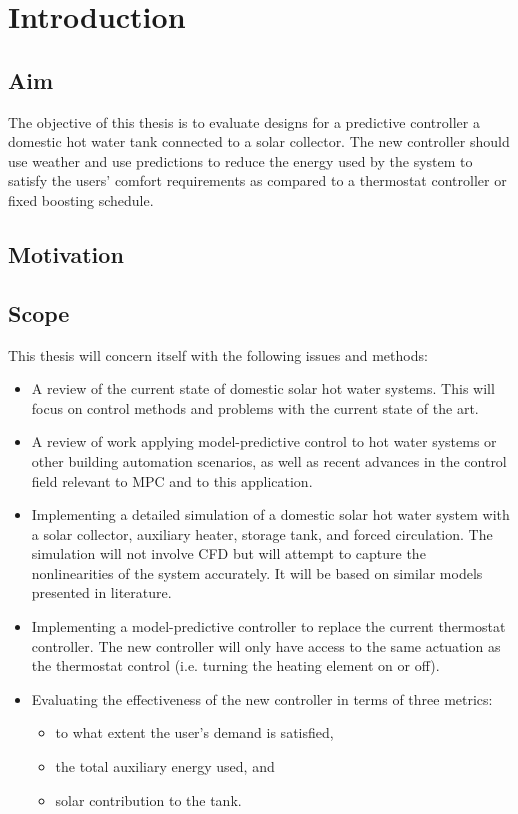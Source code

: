 \chapter{Introduction}

\section{Aim}

The objective of this thesis is to evaluate designs for a predictive controller a domestic hot water tank connected to a solar collector.
The new controller should use weather and use predictions to reduce the energy used by the system to satisfy the users' comfort requirements as compared to a thermostat controller or fixed boosting schedule.


\section{Motivation}

\section{Scope}

This thesis will concern itself with the following issues and methods:

\begin{itemize}
   \item A review of the current state of domestic solar hot water systems.
         This will focus on control methods and problems with the current state of the art.
   \item A review of work applying model-predictive control to hot water systems or other building automation scenarios, as well as recent advances in the control field relevant to MPC and to this application.
   \item Implementing a detailed simulation of a domestic solar hot water system with a solar collector, auxiliary heater, storage tank, and forced circulation.
         The simulation will not involve CFD but will attempt to capture the nonlinearities of the system accurately.
         It will be based on similar models presented in literature.
   \item Implementing a model-predictive controller to replace the current thermostat controller.
         The new controller will only have access to the same actuation as the thermostat control (i.e. turning the heating element on or off).
   \item Evaluating the effectiveness of the new controller in terms of three metrics:
         \begin{itemize}
            \item to what extent the user's demand is satisfied,
            \item the total auxiliary energy used, and
            \item solar contribution to the tank.
         \end{itemize}
\end{itemize}


